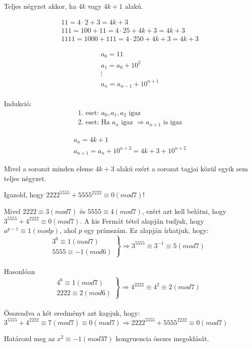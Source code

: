 \begin{solution}
	Teljes négyzet akkor, ha $4k$ vagy $4k+1$ alakú.
	
	\begin{align*}
		& 11=4\cdot2+3=4k+3\\
		& 111=100+11=4\cdot25+4k+3=4k+3\\
		& 1111=1000+111=4\cdot250+4k+3=4k+3
	\end{align*}
	
	\begin{align*}
		& a_{0}=11\\
		& a_{1}=a_{0}+10^{2}\\
		& \vdots\\
		& a_{n}=a_{n-1}+10^{n+1}\\
	\end{align*}
	
	Indukció: 
	\begin{align*}
		& \text{1. eset: }a_{0},a_{1},a_{2}\text{ igaz}\\
		& \text{2. eset: Ha }a_{n}\text{ igaz }\Rightarrow a_{n+1}\text{ is igaz}
	\end{align*}
	
	\begin{align*}
		& a_{n}=4k+1\\
		& a_{n+1}=a_{n}+10^{n+2}=4k+3+10^{n+2}
	\end{align*}
	
	Mivel a sorozat minden eleme $4k+3$ alakú ezért a sorozat tagjai
	közül egyik sem teljes négyzet.
\end{solution}
\begin{extraproblem}
	Igazold, hogy $2222^{5555}+5555^{2222}\equiv0(mod7)$! 
\end{extraproblem}

\begin{solution}
	Mivel $2222\equiv3(mod7)$ és $5555\equiv4(mod7)$, ezért azt kell
	belátni, hogy $3^{5555}+4^{2222}\equiv0(mod7)$. A kis Fermát tétel
	alapján tudjuk, hogy $a^{p-1}\equiv1(modp)$, ahol $p$ egy prímszám.
	Ez alapján írhatjuk, hogy: 
	\[
	\left.\begin{aligned}3^{6}\equiv1(mod7)\\
		5555\equiv-1(mod6)
	\end{aligned}
	\right\} \Rightarrow3^{5555}\equiv3^{-1}\equiv5(mod7)
	\]
	\\
	Hasonlóan 
	\[
	\left.\begin{aligned}4^{6}\equiv1(mod7)\\
		2222\equiv2(mod6)
	\end{aligned}
	\right\} \Rightarrow4^{2222}\equiv4^{2}\equiv2(mod7)
	\]
	\\
	Összeadva a két eredményt azt kapjuk, hogy: $3^{5555}+4^{2222}\equiv7(mod7)\equiv0(mod7)\Rightarrow2222^{5555}+5555^{2222}\equiv0(mod7)$ 
\end{solution}
\begin{extraproblem}
	Határozd meg az $x^{2}\equiv-1(mod37)$ kongruencia összes megoldását. 
\end{extraproblem}

